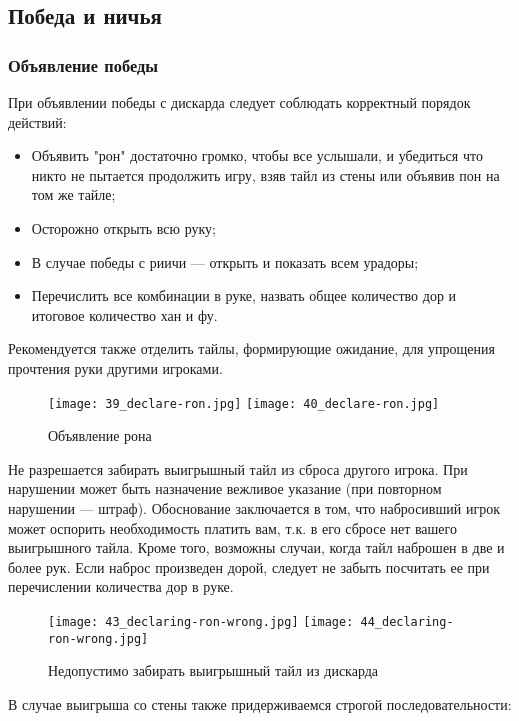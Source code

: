 \subsection{Победа и ничья}

\subsubsection{Объявление победы}

При объявлении победы с дискарда следует соблюдать корректный порядок действий:

\begin{itemize}
	\item Объявить "рон" достаточно громко, чтобы все услышали, и убедиться что никто не пытается продолжить игру, взяв тайл из стены или объявив пон на том же тайле;
	\item Осторожно открыть всю руку;
	\item В случае победы с риичи --- открыть и показать всем урадоры;
	\item Перечислить все комбинации в руке, назвать общее количество дор и итоговое количество хан и фу.
\end{itemize}

Рекомендуется также отделить тайлы, формирующие ожидание, для упрощения прочтения руки другими игроками.

\begin{figure}[H]
	\centering
	\texttt{[image: 39\_declare-ron.jpg]}
	\texttt{[image: 40\_declare-ron.jpg]}
	\caption{Объявление рона}
\end{figure}

Не разрешается забирать выигрышный тайл из сброса другого игрока. При нарушении может быть назначение вежливое указание (при повторном нарушении --- штраф). Обоснование заключается в том, что набросивший игрок может оспорить необходимость платить вам, т.к. в его сбросе нет вашего выигрышного тайла. Кроме того, возможны случаи, когда тайл наброшен в две и более рук. Если наброс произведен дорой, следует не забыть посчитать ее при перечислении количества дор в руке.

\begin{figure}[H]
	\centering
	\texttt{[image: 43\_declaring-ron-wrong.jpg]}
	\texttt{[image: 44\_declaring-ron-wrong.jpg]}
	\caption{Недопустимо забирать выигрышный тайл из дискарда}
\end{figure}

В случае выигрыша со стены также придерживаемся строгой последовательности:

